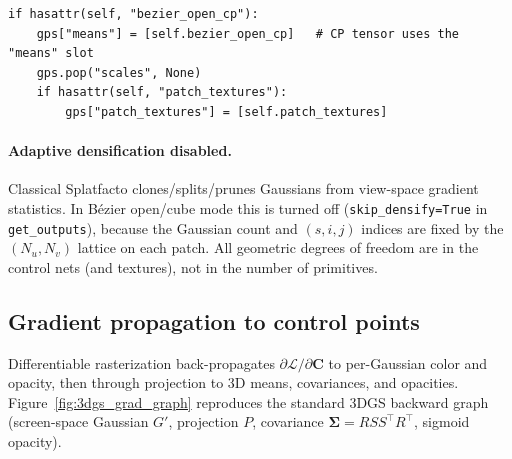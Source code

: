 \documentclass{report}
\newcommand{\filepath}[1]{\nolinkurl{#1}}
\newcommand{\code}[1]{\nolinkurl{#1}}
\begin{document}
\begin{lstlisting}[caption={Open/cube B\'ezier parameter groups (\filepath{splatfacto.py}).},label={lst:param_groups}]
if hasattr(self, "bezier_open_cp"):
    gps["means"] = [self.bezier_open_cp]   # CP tensor uses the "means" slot
    gps.pop("scales", None)
    if hasattr(self, "patch_textures"):
        gps["patch_textures"] = [self.patch_textures]
\end{lstlisting}

\paragraph{Adaptive densification disabled.}
Classical Splatfacto clones/splits/prunes Gaussians from view-space gradient statistics. In B\'ezier open/cube mode this is turned off (\code{skip\_densify=True} in \code{get\_outputs}), because the Gaussian count and $(s,i,j)$ indices are fixed by the $(N_u,N_v)$ lattice on each patch. All geometric degrees of freedom are in the control nets (and textures), not in the number of primitives.

\subsection{Gradient propagation to control points}
\label{subsec:bezier_gradients}

Differentiable rasterization \cite{kerbl2023gaussian} back-propagates $\partial\mathcal{L}/\partial\mathbf{C}$ to per-Gaussian color and opacity, then through projection to 3D means, covariances, and opacities. Figure~\ref{fig:3dgs_grad_graph} reproduces the standard 3DGS backward graph (screen-space Gaussian $G'$, projection $P$, covariance $\boldsymbol{\Sigma}=RSS^\top R^\top$, sigmoid opacity).
\end{document}
